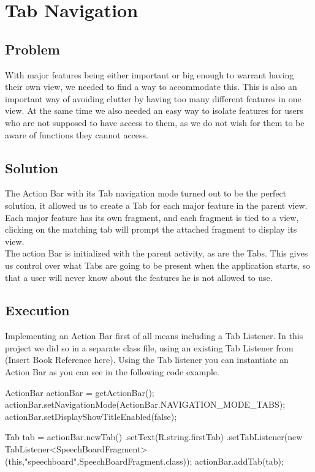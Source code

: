\section{Tab Navigation} %
\subsection*{Problem}
With major features being either important or big enough to warrant having their own view, we needed to find a way to accommodate this.
This is also an important way of avoiding clutter by having too many different features in one view.
At the same time we also needed an easy way to isolate features for users who are not supposed to have access to them, as we do not wish for them to be aware of functions they cannot access.

\subsection*{Solution}
The Action Bar with its Tab navigation mode turned out to be the perfect solution, it allowed us to create a Tab for each major feature in the parent view.
Each major feature has its own fragment, and each fragment is tied to a view, clicking on the matching tab will prompt the attached fragment to display its view.\\
The action Bar is initialized with the parent activity, as are the Tabs.
This gives us control over what Tabs are going to be present when the application starts, so that a user will never know about the features he is not allowed to use.

\subsection*{Execution}
Implementing an Action Bar first of all means including a Tab Listener.
In this project we did so in a separate class file, using an existing Tab Listener from (Insert Book Reference here).
Using the Tab listener you can instantiate an Action Bar as you can see in the following code example.

\begin{source}{}
		ActionBar actionBar = getActionBar();
		actionBar.setNavigationMode(ActionBar.NAVIGATION_MODE_TABS); 
		actionBar.setDisplayShowTitleEnabled(false);
		
		Tab tab = actionBar.newTab()
				.setText(R.string.firstTab) 
				.setTabListener(new TabListener<SpeechBoardFragment>(this,"speechboard",SpeechBoardFragment.class));
		actionBar.addTab(tab);
\end{source}

